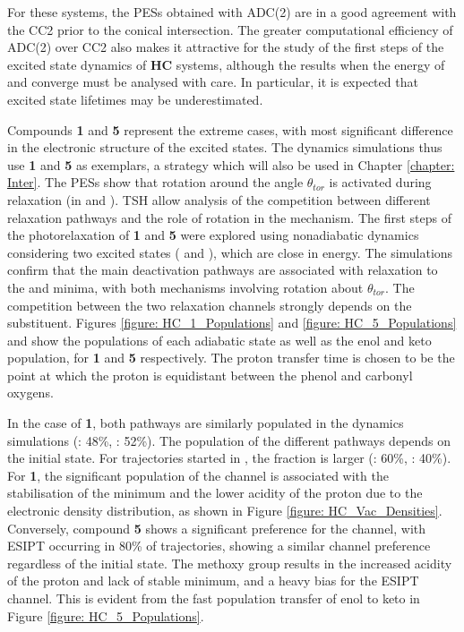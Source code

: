 For these systems, the \sone{} \acp{PES} obtained with ADC(2) are in a good agreement with the CC2 prior to the conical intersection. The greater computational efficiency of ADC(2) over CC2 also makes it attractive for the study of the first steps of the excited state dynamics of \textbf{HC} systems, although the results when the energy of \sone{} and \szero{} converge must be analysed with care. In particular, it is expected that excited state lifetimes may be underestimated. 

Compounds \textbf{1} and \textbf{5} represent the extreme cases, with most significant difference in the electronic structure of the excited states. The dynamics simulations thus use \textbf{1} and \textbf{5} as exemplars, a strategy which will also be used in Chapter \ref{chapter: Inter}.  The \acp{PES} show that rotation around the angle $\theta_{tor}$ is activated during relaxation (in \Estar{} and \Kstar{}). \ac{TSH} allow analysis of the competition between different relaxation pathways and the role of rotation in the mechanism. The first steps of the photorelaxation of \textbf{1} and \textbf{5} were explored using nonadiabatic dynamics considering two excited states (\stwo{} and \sone{}), which are close in energy. The simulations confirm that the main deactivation pathways are associated with relaxation to the \Kstar{} and \Estar{} minima, with both mechanisms involving  rotation about $\theta_{tor}$. The competition between the two relaxation channels strongly depends on the substituent. Figures \ref{figure: HC_1_Populations} and \ref{figure: HC_5_Populations} and show the populations of each adiabatic state as well as the enol and keto population, for \textbf{1} and \textbf{5} respectively. The proton transfer time is chosen to be the point at which the proton is equidistant between the phenol and carbonyl oxygens.

In the case of \textbf{1}, both pathways are similarly populated in the dynamics simulations (\Kstar: 48\%, \Estar: 52\%). The population of the different pathways depends on the initial state. For trajectories started in \stwo{}, the fraction is larger (\Kstar: 60\%, \Estar: 40\%). For \textbf{1}, the significant population of the \Estar{} channel is associated with the stabilisation of the \Estar{} minimum and the lower acidity of the proton due to the electronic density distribution, as shown in Figure \ref{figure: HC_Vac_Densities}. Conversely, compound \textbf{5} shows a significant preference for the \Kstar{} channel, with ESIPT occurring in 80\% of trajectories, showing a similar channel preference regardless of the initial state. The methoxy group results in the increased acidity of the proton and lack of stable \Estar{} minimum, and a heavy bias for the ESIPT channel. This is evident from the fast population transfer of enol to keto in Figure \ref{figure: HC_5_Populations}.

